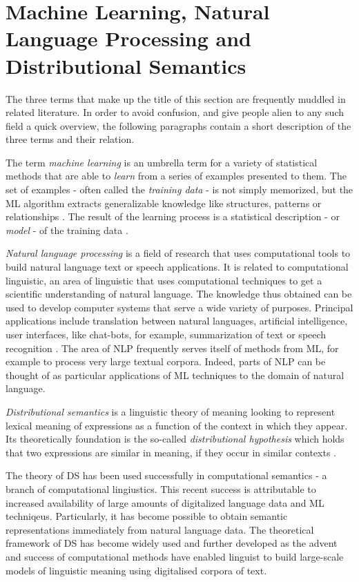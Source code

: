\documentclass{article}
\begin{document}
\section{Machine Learning, Natural Language Processing and Distributional Semantics}\hypertarget{sec2}{ }
The three terms that make up the title of this section are frequently muddled in related literature. In order to avoid confusion, and give people alien to any such field a quick overview, the following paragraphs contain a short description of the three terms and their relation.
 
The term \emph{machine learning} is an umbrella term for a variety of statistical methods that are able to \emph{learn} from a series of examples presented to them. The set of examples - often called the \emph{training data} - is not simply memorized, but the ML algorithm extracts generalizable knowledge like structures, patterns or relationships \cite{domingos2012few}.
The result of the learning process is a statistical description - or \emph{model} - of the training data \cite{fayyad2001digital}.

\emph{Natural language processing} is a field of research that uses computational tools to build natural language text or speech applications. It is related to computational linguistic, an area of linguistic that uses computational techniques to get a scientific understanding of natural language. The knowledge thus obtained can be used  to develop computer systems that serve a wide variety of purposes. Principal applications include translation between natural languages, artificial intelligence, user interfaces, like chat-bots, for example, summarization of text or speech recognition \cite{chowdhury2003natural}. The area of NLP frequently serves itself of methods from ML, for example to process very large textual corpora. Indeed, parts of NLP can be thought of as particular applications of ML techniques to the domain of natural language.

\emph{Distributional semantics} is a linguistic theory of meaning looking to represent lexical meaning of expressions as a function of the context in which they appear. Its theoretically foundation is the so-called \emph{distributional hypothesis} which holds that two expressions are similar in meaning, if they occur in similar contexts \cite{harris1954distributional}.

The theory of DS has been used successfully in computational semantics - a branch of computational lingiustics. This recent success is attributable to increased availability of large amounts of digitalized language data and ML techniqeus. Particularly, it has become possible to obtain semantic representations immediately from natural language data. The theoretical framework of DS has become widely used and further developed as the advent and success of computational methods have enabled linguist to build large-scale models of linguistic meaning using digitalised corpora of text. 
\end{document}
